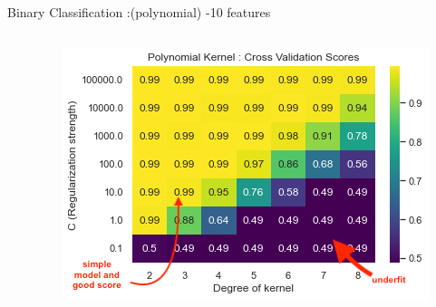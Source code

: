 \documentclass[12pt,t]{beamer}
\begin{document}
\begin{frame}[t]{Binary Classification :(polynomial) -10 features}
\begin{columns}
\begin{column}[T]{0.35\linewidth}
        \end{column}
        \begin{column}[T]{0.7\linewidth}
            \includegraphics[width=\linewidth]{images/p1a/2(binary clf)/classes1and4_libsvm_poly10f.png}
        \end{column}
    \end{columns}
\end{frame}
\end{document}
